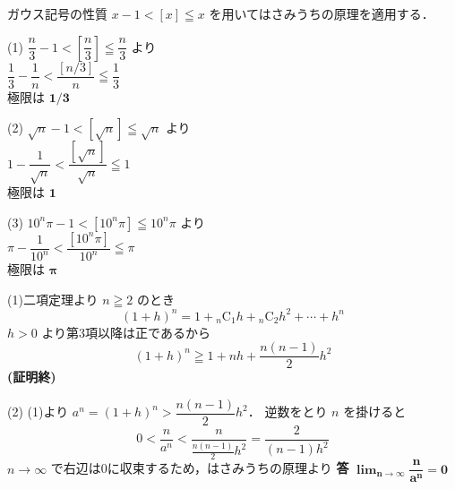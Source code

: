 \documentclass[a4paper,11pt]{ltjsarticle}
\begin{document}
\begin{toi}
ガウス記号の性質 $x-1 < [x] \leqq x$ を用いてはさみうちの原理を適用する．

\noindent
\begin{minipage}{0.33\linewidth}
(1) $\dfrac{n}{3}-1 < \left[\dfrac{n}{3}\right] \leqq \dfrac{n}{3}$ より\\
$\dfrac{1}{3}-\dfrac{1}{n} < \dfrac{[n/3]}{n} \leqq \dfrac{1}{3}$\\
極限は $\boldsymbol{1/3}$
\end{minipage}
\begin{minipage}{0.33\linewidth}
(2) $\sqrt{n}-1 < [\sqrt{n}] \leqq \sqrt{n}$ より\\
$1-\dfrac{1}{\sqrt{n}} < \dfrac{[\sqrt{n}]}{\sqrt{n}} \leqq 1$\\
極限は $\boldsymbol{1}$
\end{minipage}
\begin{minipage}{0.33\linewidth}
(3) $10^n\pi-1 < [10^n\pi] \leqq 10^n\pi$ より\\
$\pi-\dfrac{1}{10^n} < \dfrac{[10^n\pi]}{10^n} \leqq \pi$\\
極限は $\boldsymbol{\pi}$
\end{minipage}
\end{toi}

\begin{toi}
(1)二項定理より $n \geqq 2$ のとき
\[
(1+h)^n = 1 + {}_n\mathrm{C}_1 h + {}_n\mathrm{C}_2 h^2 + \cdots + h^n
\]
$h>0$ より第3項以降は正であるから
\[
(1+h)^n \geqq 1 + nh + \frac{n(n-1)}{2}h^2
\]
\hfill \textbf{(証明終)}

\vspace{1em}

(2) (1)より $a^n = (1+h)^n > \dfrac{n(n-1)}{2}h^2$．
逆数をとり $n$ を掛けると
\[
0 < \frac{n}{a^n} < \frac{n}{\frac{n(n-1)}{2}h^2} = \frac{2}{(n-1)h^2}
\]
$n\to\infty$ で右辺は0に収束するため，はさみうちの原理より
\hfill \textbf{答} \quad $\boldsymbol{\lim_{n\to\infty}\dfrac{n}{a^n}=0}$
\end{toi}
\end{document}
